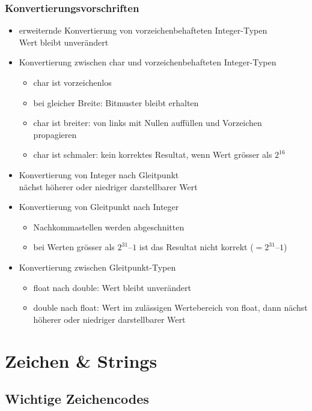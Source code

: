 \documentclass[a4paper,10pt]{article}
\begin{document}
\subsubsection{Konvertierungsvorschriften}
\begin{itemize}
	\item erweiternde Konvertierung von vorzeichenbehafteten Integer-Typen \\
		Wert bleibt unverändert
	\item Konvertierung zwischen char und vorzeichenbehafteten Integer-Typen
		\begin{itemize}
			\item char ist vorzeichenlos
			\item bei gleicher Breite: Bitmuster bleibt erhalten
			\item char ist breiter: von links mit Nullen auffüllen und Vorzeichen propagieren
			\item char ist schmaler: kein korrektes Resultat, wenn Wert grösser als $2^16$
		\end{itemize}
	\item Konvertierung von Integer nach Gleitpunkt \\
		nächst höherer oder niedriger darstellbarer Wert
	\item Konvertierung von Gleitpunkt nach Integer
		\begin{itemize}
			\item Nachkommastellen werden abgeschnitten
			\item bei Werten grösser als $2^31 – 1$ ist das Resultat nicht korrekt ($= 2^31 – 1$)
		\end{itemize}
	\item Konvertierung zwischen Gleitpunkt-Typen
		\begin{itemize}
			\item float nach double: Wert bleibt unverändert
			\item double nach float: Wert im zulässigen Wertebereich von float, dann nächst höherer oder niedriger darstellbarer Wert
		\end{itemize}
\end{itemize}

\newpage
\section{Zeichen \& Strings}
\subsection{Wichtige Zeichencodes}
\end{document}
